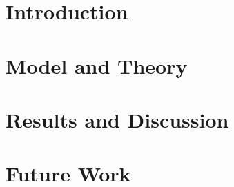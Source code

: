 




%


\section{Introduction}


\section{Model and Theory}


\section{Results and Discussion}


\section{Future Work}


%

